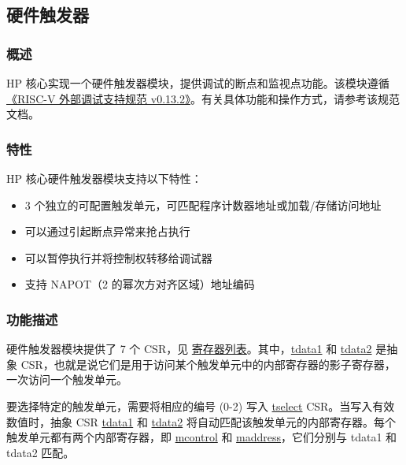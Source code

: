 \documentclass[main\_\_CN.tex]{subfiles}
\begin{document}

\newpage
\subsection{硬件触发器}
\label{sec:riscvcpu-hwt}

\subsubsection{概述}
\label{sec:riscvcpu-hwt-overview}

HP 核心实现一个硬件触发器模块，提供调试的断点和监视点功能。该模块遵循 \href{https://riscv.org/wp-content/uploads/2019/03/riscv-debug-release.pdf}{《RISC-V 外部调试支持规范 v0.13.2》}。有关具体功能和操作方式，请参考该规范文档。

\subsubsection{特性}
\label{sec:riscvcpu-hwt-features}

HP 核心硬件触发器模块支持以下特性：

\begin{itemize}
    \item 3 个独立的可配置触发单元，可匹配程序计数器地址或加载/存储访问地址
    \item 可以通过引起断点异常来抢占执行
    \item 可以暂停执行并将控制权转移给调试器
    \item 支持 NAPOT（2 的幂次方对齐区域）地址编码
\end{itemize}

\subsubsection{功能描述}
\label{sec:riscvcpu-hwt-func-descr}

硬件触发器模块提供了 7 个 CSR，见 \hyperref[sec:riscvcpu-hwt-reg-summ]{寄存器列表}。其中，\hyperref[regdesc:TDATA1]{tdata1} 和 \hyperref[regdesc:TDATA2]{tdata2} 是抽象 CSR，也就是说它们是用于访问某个触发单元中的内部寄存器的影子寄存器，一次访问一个触发单元。

要选择特定的触发单元，需要将相应的编号 (0-2) 写入 \hyperref[regdesc:TSELECT]{tselect} CSR。当写入有效数值时，抽象 CSR \hyperref[regdesc:TDATA1]{tdata1} 和 \hyperref[regdesc:TDATA2]{tdata2} 将自动匹配该触发单元的内部寄存器。每个触发单元都有两个内部寄存器，即 \hyperref[regdesc:MCONTROL]{mcontrol} 和 \hyperref[regdesc:MADDRESS]{maddress}，它们分别与 tdata1 和 tdata2 匹配。
\end{document}
